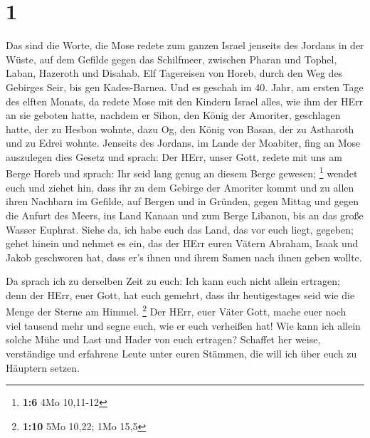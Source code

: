 \hypertarget{section}{%
\section{1}\label{section}}

 Das sind die Worte, die Mose redete zum ganzen Israel
jenseits des Jordans in der Wüste, auf dem Gefilde gegen das Schilfmeer,
zwischen Pharan und Tophel, Laban, Hazeroth und Disahab. 
Elf Tagereisen von Horeb, durch den Weg des Gebirges Seir, bis gen
Kades-Barnea.  Und es geschah im 40. Jahr, am ersten Tage
des elften Monats, da redete Mose mit den Kindern Israel alles, wie ihm
der HErr an sie geboten hatte,  nachdem er Sihon, den König
der Amoriter, geschlagen hatte, der zu Hesbon wohnte, dazu Og, den König
von Basan, der zu Astharoth und zu Edrei wohnte.  Jenseits
des Jordans, im Lande der Moabiter, fing an Mose auszulegen dies Gesetz
und sprach:  Der HErr, unser Gott, redete mit uns am Berge
Horeb und sprach: Ihr seid lang genug an diesem Berge gewesen;
\footnote{\textbf{1:6} 4Mo 10,11-12}  wendet euch und ziehet
hin, dass ihr zu dem Gebirge der Amoriter kommt und zu allen ihren
Nachbarn im Gefilde, auf Bergen und in Gründen, gegen Mittag und gegen
die Anfurt des Meers, ins Land Kanaan und zum Berge Libanon, bis an das
große Wasser Euphrat.  Siehe da, ich habe euch das Land, das
vor euch liegt, gegeben; gehet hinein und nehmet es ein, das der HErr
euren Vätern Abraham, Isaak und Jakob geschworen hat, dass er's ihnen
und ihrem Samen nach ihnen geben wollte.

 Da sprach ich zu derselben Zeit zu euch: Ich kann euch
nicht allein ertragen;  denn der HErr, euer Gott, hat euch
gemehrt, dass ihr heutigestages seid wie die Menge der Sterne am Himmel.
\footnote{\textbf{1:10} 5Mo 10,22; 1Mo 15,5}  Der HErr,
euer Väter Gott, mache euer noch viel tausend mehr und segne euch, wie
er euch verheißen hat!  Wie kann ich allein solche Mühe und
Last und Hader von euch ertragen?  Schaffet her weise,
verständige und erfahrene Leute unter euren Stämmen, die will ich über
euch zu Häuptern setzen.

